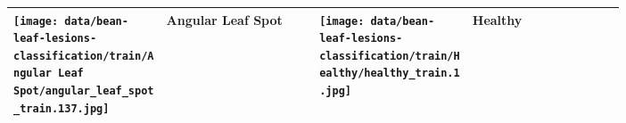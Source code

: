 \begin{figure}[t!]
\begin{tabular}{|p{0.22\linewidth}|p{0.22\linewidth}|p{0.22\linewidth}|p{0.22\linewidth}|}
            \texttt{[image: data/bean-leaf-lesions-classification/train/Angular Leaf Spot/angular\_leaf\_spot\_train.137.jpg]} & Angular Leaf Spot & 
            \texttt{[image: data/bean-leaf-lesions-classification/train/Healthy/healthy\_train.1.jpg]} & Healthy \\
            \hline
        
        \end{tabular}
    \end{figure}
    